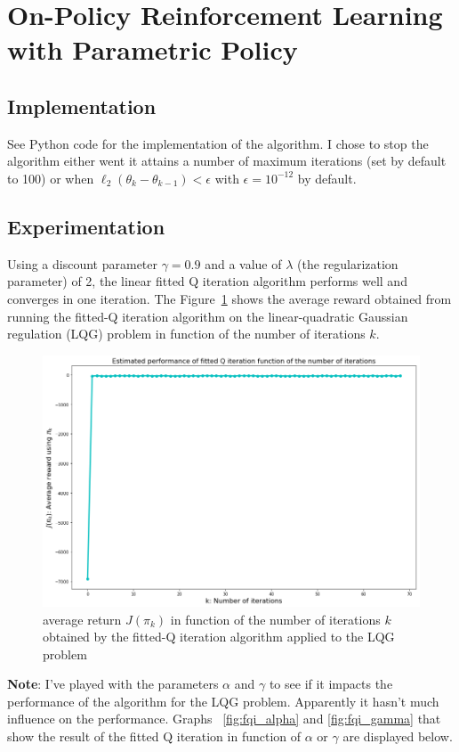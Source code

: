 \documentclass[11pt]{article}
\numberwithin{figure}{section} %
\begin{document}
\section{On-Policy Reinforcement Learning with Parametric Policy}
\subsection{Implementation}
See Python code for the implementation of the algorithm. I chose to stop the algorithm either went it attains a number of maximum iterations (set by default to 100) or when $\ell_2(\theta_k - \theta_{k-1}) < \epsilon$ with $\epsilon=10^{-12}$ by default.

\subsection{Experimentation}
Using a discount parameter $\gamma = 0.9$ and a value of $\lambda$ (the regularization parameter) of 2, the linear fitted Q iteration algorithm performs well and converges in one iteration. The Figure~\ref{fig:fqi} shows the average reward obtained from running the fitted-Q iteration algorithm on the linear-quadratic Gaussian regulation (LQG) problem in function of the number of iterations $k$.

\begin{figure}[H]
		\centering
		\includegraphics[width=0.9\linewidth]{images/fqi_single}
		\caption{average return $J(\pi_k)$ in function of the number of iterations $k$ obtained by the fitted-Q iteration algorithm applied to the LQG problem}
		\label{fig:fqi}
\end{figure}


\textbf{Note}: I've played with the parameters $\alpha$ and $\gamma$ to see if it impacts the performance of the algorithm for the LQG problem. Apparently it hasn't much influence on the performance. Graphs ~\ref{fig:fqi_alpha} and \ref{fig:fqi_gamma} that show the result of the fitted Q iteration in function of $\alpha$ or $\gamma$ are displayed below.
\end{document}
